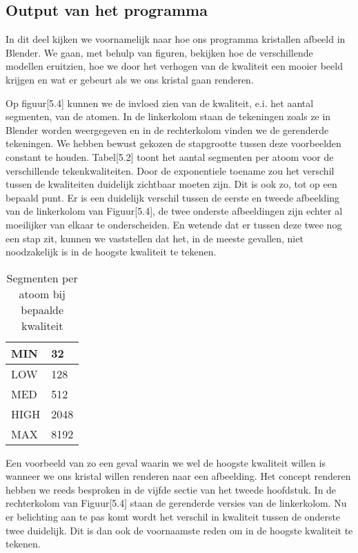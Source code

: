 \subsection{Output van het programma}
In dit deel kijken we voornamelijk naar hoe ons programma kristallen afbeeld in Blender. We gaan, met behulp van figuren, bekijken hoe de verschillende modellen eruitzien, hoe we door het verhogen van de kwaliteit een mooier beeld krijgen en wat er gebeurt als we ons kristal gaan renderen.
\par
Op figuur[5.4] kunnen we de invloed zien van de kwaliteit, e.i. het aantal segmenten, van de atomen. In de linkerkolom staan de tekeningen zoals ze in Blender worden weergegeven en in de rechterkolom vinden we de gerenderde tekeningen. We hebben bewust gekozen de stapgrootte tussen deze voorbeelden constant te houden. Tabel[5.2] toont het aantal segmenten per atoom voor de verschillende tekenkwaliteiten. Door de exponentiele toename zou het verschil tussen de kwaliteiten duidelijk zichtbaar moeten zijn. Dit is ook zo, tot op een bepaald punt. Er is een duidelijk verschil tussen de eerste en tweede afbeelding van de linkerkolom van Figuur[5.4], de twee onderste afbeeldingen zijn echter al moeilijker van elkaar te onderscheiden. En wetende dat er tussen deze twee nog een stap zit, kunnen we vaststellen dat het, in de meeste gevallen, niet noodzakelijk is in de hoogste kwaliteit te tekenen.   
\par
\begin{table}[H]
\begin{tabular}{|l|l|}
\hline
MIN  & 32   \\ \hline
LOW  & 128  \\ \hline
MED  & 512  \\ \hline
HIGH & 2048 \\ \hline
MAX  & 8192 \\ \hline
\end{tabular}
\caption{Segmenten per atoom bij bepaalde kwaliteit}
\end{table}
\par
Een voorbeeld van zo een geval waarin we wel de hoogste kwaliteit willen is wanneer we ons kristal willen renderen naar een afbeelding. Het concept renderen hebben we reeds besproken in de vijfde sectie van het tweede hoofdstuk. In de rechterkolom van Figuur[5.4] staan de gerenderde versies van de linkerkolom. Nu er belichting aan te pas komt wordt het verschil in kwaliteit tussen de onderste twee duidelijk. Dit is dan ook de voornaamste reden om in de hoogste kwaliteit te tekenen.   
\par


